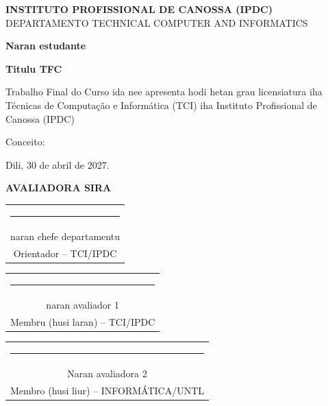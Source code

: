 \begin{titlepage}
\centering

{\large
\textbf{INSTITUTO PROFISSIONAL DE CANOSSA (IPDC)} \\
DEPARTAMENTO TECHNICAL COMPUTER AND INFORMATICS
}

\vspace{1cm}

{\large \textbf{Naran estudante}}

\vspace{2cm}

{\Large \textbf{Titulu TFC}}

\vspace{1.5cm}

\begin{minipage}{0.9\textwidth}
\small

Trabalho Final do Curso ida nee apresenta hodi hetan grau licensiatura iha Técnicas de Computação e Informática (TCI) iha Instituto Profissional de Canossa (IPDC)

\end{minipage}

\vspace{1.5cm}

\raggedright
Conceito: \underline{\hspace{3cm}}

\vspace{0.3cm}
Dili, 30 de abril de 2027.

\vspace{1.5cm}
\centering
\textbf{AVALIADORA SIRA}

\vspace{1cm}

\begin{tabular}{c}
\rule{10cm}{0.4pt} \\
naran chefe departamentu \\
Orientador – TCI/IPDC
\end{tabular}

\vspace{0.8cm}

\begin{tabular}{c}
\rule{10cm}{0.4pt} \\
naran avaliador 1 \\
Membru (husi laran)  – TCI/IPDC
\end{tabular}

\vspace{0.8cm}

\begin{tabular}{c}
\rule{10cm}{0.4pt} \\
Naran avaliadora 2 \\
Membro (husi liur) – INFORMÁTICA/UNTL
\end{tabular}

\vfill

\end{titlepage}

